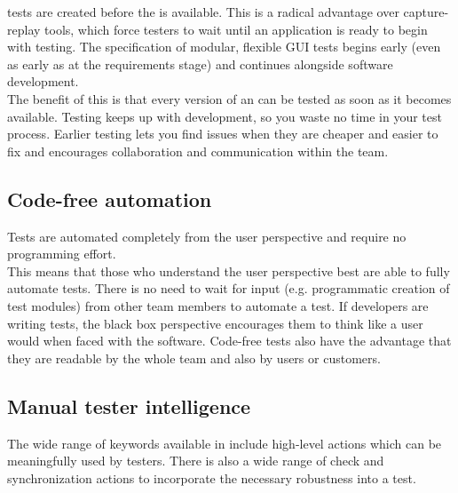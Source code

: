 \app{} tests are created before the \gdaut{} is available. This is a radical advantage over capture-replay tools, which force testers to wait until an application is ready to begin with testing. The specification of modular, flexible GUI tests begins early (even as early as at the requirements stage) and continues alongside software development.\\ 
The benefit of this is that every version of an \gdaut{} can be tested as soon as it becomes available. Testing keeps up with development, so you waste no time in your test process. Earlier testing lets you find issues when they are cheaper and easier to fix and encourages collaboration and communication within the team.

\subsection{Code-free automation}

Tests are automated completely from the user perspective and require no programming effort. \\

This means that those who understand the user perspective best are able to fully automate tests. There is no need to wait for input (e.g. programmatic creation of test modules) from other team members to automate a test. If developers are writing tests, the black box perspective encourages them to think like a user would when faced with the software. Code-free tests also have the advantage that they are readable by the whole team and also by users or customers. 


\subsection{Manual tester intelligence}

The wide range of keywords available in \app{} include high-level actions which can be meaningfully used by testers. There is also a wide range of check and synchronization actions to incorporate the necessary robustness into a test. 

